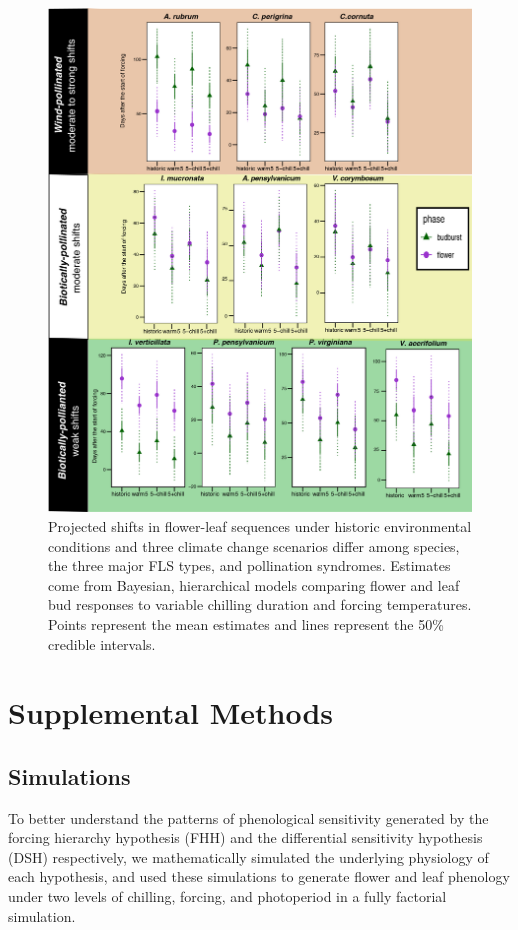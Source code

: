 \documentclass{article}\usepackage[]{graphicx}\usepackage[]{color}
\begin{document}
 \begin{figure}[!ht]
    \centering
 \includegraphics[width=\textwidth]{..//Plots/Flobuds_manuscript_figs/climpredictions.jpg}
    \caption{Projected shifts in flower-leaf sequences under historic environmental conditions and three climate change scenarios differ among species, the three major FLS types, and pollination syndromes. Estimates come from Bayesian, hierarchical models comparing flower and leaf bud responses to variable chilling duration and forcing temperatures. Points represent the mean estimates and lines represent the 50\% credible intervals.}
    \label{fig:preddy_sp}
\end{figure}

\pagebreak[4]

\section*{Supplemental Methods}
\subsection*{Simulations}
\noident To better understand the patterns of phenological sensitivity generated by the forcing hierarchy hypothesis (FHH) and the differential sensitivity hypothesis (DSH) respectively, we mathematically simulated the underlying physiology of each hypothesis, and used these simulations to generate flower and leaf phenology under two levels of chilling, forcing, and photoperiod in a fully factorial simulation.\\
\end{document}
